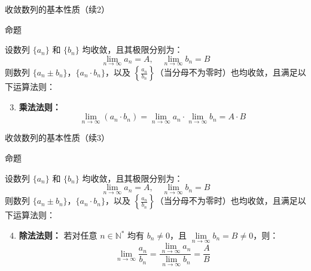 \documentclass[aspectratio=169,10pt,fontset=fandol]{ctexbeamer}
\begin{document}
\begin{frame}[t,fragile]{收敛数列的基本性质（续2）}
\footnotesize
\begin{block}{命题}
{\footnotesize



设数列 $\{a_n\}$ 和 $\{b_n\}$ 均收敛，且其极限分别为：
\begin{equation*}
	\lim\limits_{n \to \infty} a_n = A, \quad \lim\limits_{n \to \infty} b_n = B
\end{equation*}
则数列 $\{a_n \pm b_n\}$，$\{a_n \cdot b_n\}$，以及 $\left\{\frac{a_n}{b_n}\right\}$（当分母不为零时）也均收敛，且满足以下运算法则：

\begin{enumerate}
	\setcounter{enumi}{2}
\item \textbf{乘法法则：}
	\begin{equation*}
		\lim_{n \to \infty} (a_n \cdot b_n) = \lim_{n \to \infty} a_n \cdot \lim_{n \to \infty} b_n = A \cdot B
	\end{equation*}
	
	
\end{enumerate}
}
\end{block}
\end{frame}
\begin{frame}[t,fragile]{收敛数列的基本性质（续3）}
\footnotesize
\begin{block}{命题}
{\footnotesize



设数列 $\{a_n\}$ 和 $\{b_n\}$ 均收敛，且其极限分别为：
\begin{equation*}
	\lim\limits_{n \to \infty} a_n = A, \quad \lim\limits_{n \to \infty} b_n = B
\end{equation*}
则数列 $\{a_n \pm b_n\}$，$\{a_n \cdot b_n\}$，以及 $\left\{\frac{a_n}{b_n}\right\}$（当分母不为零时）也均收敛，且满足以下运算法则：

\begin{enumerate}
	\setcounter{enumi}{3}
\item \textbf{除法法则：}
	若对任意 $n \in \mathbb{N}^*$ 均有 $b_n \neq 0$，且 $\lim\limits_{n \to \infty} b_n = B \neq 0$，则：
	\begin{equation*}
		\lim_{n \to \infty} \frac{a_n}{b_n} = \frac{\lim\limits_{n \to \infty} a_n}{\lim\limits_{n \to \infty} b_n} = \frac{A}{B}
	\end{equation*}
\end{enumerate}

}
\end{block}
\end{frame}
\end{document}
